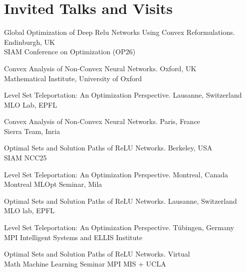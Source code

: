 \documentclass[11pt, a4paper]{article}
\newcommand{\mleftsize}{4.75em}
\begin{document}
\section{Invited Talks and Visits}
\newcommand{\where}[1]{{#1}}
\begin{description}[leftmargin=\mleftsize,style=nextline,font=\normalfont\space]
    \item[2026] Global Optimization of Deep Relu Networks Using Convex Reformulations. \hfill Endinburgh, UK \\
          SIAM Conference on Optimization (OP26)

    \item[2026] Convex Analysis of Non-Convex Neural Networks.  \hfill Oxford, UK\\
          Mathematical Institute, University of Oxford

    \item[2026] Level Set Teleportation: An Optimization Perspective.  \hfill Lausanne, Switzerland\\
          MLO Lab, EPFL

    \item[2026] Convex Analysis of Non-Convex Neural Networks. \hfill Paris, France\\
          Sierra Team, Inria

    \item[2025] Optimal Sets and Solution Paths of ReLU Networks. \hfill Berkeley, USA\\
          SIAM NCC25

    \item[2025] Level Set Teleportation: An Optimization Perspective. \hfill Montreal, Canada\\
          Montreal MLOpt Seminar, Mila

    \item[2024] Optimal Sets and Solution Paths of ReLU Networks. \hfill Lausanne, Switzerland\\
          MLO lab, EPFL

    \item[2024] Level Set Teleportation: An Optimization Perspective. \hfill Tübingen, Germany\\
          MPI Intelligent Systems and ELLIS Institute

    \item[2024] Optimal Sets and Solution Paths of ReLU Networks. \hfill Virtual\\
          Math Machine Learning Seminar MPI MIS + UCLA


\end{description}
\end{document}
